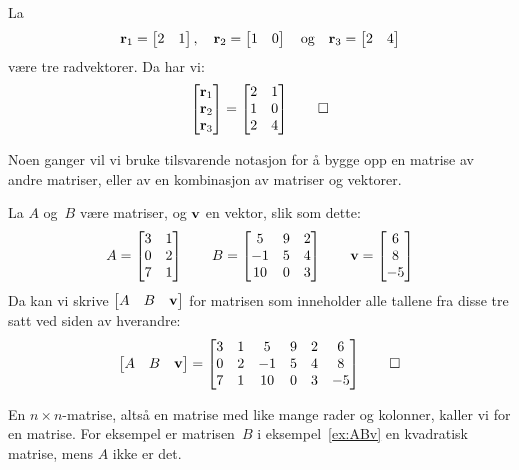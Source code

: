 \begin{ex}
La
\[
\mathbf{r}_1 = \begin{bmatrix} 2 & 1 \end{bmatrix},\quad
\mathbf{r}_2 = \begin{bmatrix} 1 & 0 \end{bmatrix}
\quad\text{og}\quad
\mathbf{r}_3 = \begin{bmatrix} 2 & 4 \end{bmatrix}
\]
være tre radvektorer.  Da har vi:
\[
\begin{bmatrix}
\mathbf{r}_1 \\
\mathbf{r}_2 \\
\mathbf{r}_3
\end{bmatrix}
=
\begin{bmatrix}
2 & 1 \\
1 & 0 \\
2 & 4
\end{bmatrix}
\qedhere
\]
\end{ex}

Noen ganger vil vi bruke tilsvarende notasjon for å bygge opp en
matrise av andre matriser, eller av en kombinasjon av matriser og
vektorer.

\begin{ex}
\label{ex:ABv}
La $A$ og~$B$ være matriser, og $\mathbf{v}$ en vektor, slik som dette:
\[
A =
\begin{bmatrix}
3 & 1 \\
0 & 2 \\
7 & 1
\end{bmatrix}
\qquad
B =
\begin{bmatrix}
 5 & 9 & 2 \\
-1 & 5 & 4 \\
10 & 0 & 3
\end{bmatrix}
\qquad
\mathbf{v} = \begin{bmatrix} 6 \\ 8 \\ -5 \end{bmatrix}
\]
Da kan vi skrive $\begin{bmatrix} A & B & \mathbf{v} \end{bmatrix}$ for
matrisen som inneholder alle tallene fra disse tre satt ved siden av
hverandre:
\[
\begin{bmatrix} A & B & \mathbf{v} \end{bmatrix}
=
\begin{bmatrix}
3 & 1 &  5 & 9 & 2 & 6 \\
0 & 2 & -1 & 5 & 4 & 8 \\
7 & 1 & 10 & 0 & 3 & -5
\end{bmatrix}
\qedhere
\]
\end{ex}

En $n \times n$-matrise, altså en matrise med like mange rader og
kolonner, kaller vi for en  matrise.  For eksempel
er matrisen~$B$ i eksempel~\ref{ex:ABv} en kvadratisk matrise, mens
$A$ ikke er det.




